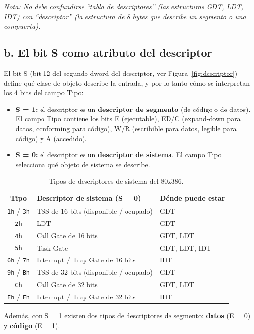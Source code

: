 \documentclass[RT]{UTNLSE}
\begin{document}
\textit{Nota: No debe confundirse ``tabla de descriptores'' (las estructuras GDT, LDT, IDT) con ``descriptor'' (la estructura de 8 bytes que describe un segmento o una compuerta).}

\subsection*{b. El bit S como atributo del descriptor}
El bit S (bit 12 del segundo dword del descriptor, ver Figura~\ref{fig:descriptor}) define qué clase de objeto describe la entrada, y por lo tanto cómo se interpretan los 4 bits del campo Tipo:
\begin{itemize}
    \item \textbf{S = 1:} el descriptor es un \textbf{descriptor de segmento} (de código o de datos). El campo Tipo contiene los bits E (ejecutable), ED/C (expand-down para datos, conforming para código), W/R (escribible para datos, legible para código) y A (accedido).
    \item \textbf{S = 0:} el descriptor es un \textbf{descriptor de sistema}. El campo Tipo selecciona qué objeto de sistema se describe.
\end{itemize}

\begin{table}[H]
\centering
\small
\begin{tabular}{@{}cll@{}}
\toprule
\textbf{Tipo} & \textbf{Descriptor de sistema (S = 0)} & \textbf{Dónde puede estar} \\
\midrule
\texttt{1h} / \texttt{3h} & TSS de 16 bits (disponible / ocupado) & GDT \\
\texttt{2h} & LDT & GDT \\
\texttt{4h} & Call Gate de 16 bits & GDT, LDT \\
\texttt{5h} & Task Gate & GDT, LDT, IDT \\
\texttt{6h} / \texttt{7h} & Interrupt / Trap Gate de 16 bits & IDT \\
\texttt{9h} / \texttt{Bh} & TSS de 32 bits (disponible / ocupado) & GDT \\
\texttt{Ch} & Call Gate de 32 bits & GDT, LDT \\
\texttt{Eh} / \texttt{Fh} & Interrupt / Trap Gate de 32 bits & IDT \\
\bottomrule
\end{tabular}
\caption{Tipos de descriptores de sistema del 80x386.}
\end{table}

Además, con S = 1 existen dos tipos de descriptores de segmento: \textbf{datos} (E = 0) y \textbf{código} (E = 1).
\end{document}

